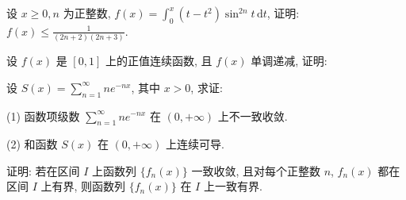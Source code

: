 设 $x \geq 0, n$ 为正整数, $f(x) = \int_{0}^{x} (t - t^2) \sin^{2n} t \, \mathrm{d}t$, 证明: $f(x) \leq \frac{1}{(2n + 2)(2n + 3)}$.\par
\par{}
设 $f(x)$ 是 $[0,1]$ 上的正值连续函数, 且 $f(x)$ 单调递减, 证明:\par
\nopagebreak[4]
设 $S(x) = \sum_{n=1}^{\infty} ne^{-nx}$, 其中 $x > 0$, 求证:\par
(1) 函数项级数 $\sum_{n=1}^{\infty} ne^{-nx}$ 在 $(0, +\infty)$ 上不一致收敛.\par
(2) 和函数 $S(x)$ 在 $(0, +\infty)$ 上连续可导.\par
证明: 若在区间 $I$ 上函数列 $\{f_n(x)\}$ 一致收敛, 且对每个正整数 $n$, $f_n(x)$ 都在区间 $I$ 上有界, 则函数列 $\{f_n(x)\}$ 在 $I$ 上一致有界.\par
